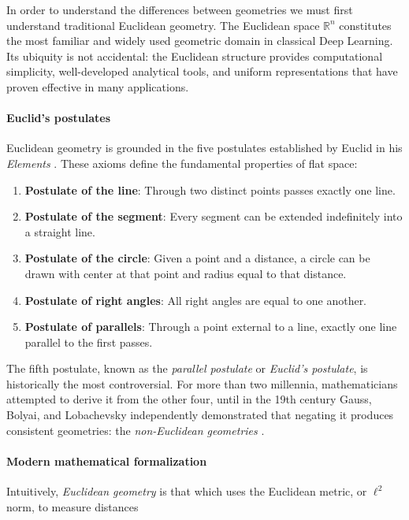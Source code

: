 In order to understand the differences between geometries we must first understand traditional Euclidean geometry. The Euclidean space $\mathbb{R}^n$ constitutes the most familiar and widely used geometric domain in classical Deep Learning. Its ubiquity is not accidental: the Euclidean structure provides computational simplicity, well-developed analytical tools, and uniform representations that have proven effective in many applications.

\paragraph{Euclid's postulates}

Euclidean geometry is grounded in the five postulates established by Euclid in his \textit{Elements} \citep{euclid1956elements}. These axioms define the fundamental properties of flat space:

\begin{enumerate}
    \item \textbf{Postulate of the line}: Through two distinct points passes exactly one line.
    \item \textbf{Postulate of the segment}: Every segment can be extended indefinitely into a straight line.
    \item \textbf{Postulate of the circle}: Given a point and a distance, a circle can be drawn with center at that point and radius equal to that distance.
    \item \textbf{Postulate of right angles}: All right angles are equal to one another.
    \item \textbf{Postulate of parallels}: Through a point external to a line, exactly one line parallel to the first passes.
\end{enumerate}

The fifth postulate, known as the \textit{parallel postulate} or \textit{Euclid's postulate}, is historically the most controversial. For more than two millennia, mathematicians attempted to derive it from the other four, until in the 19th century Gauss, Bolyai, and Lobachevsky independently demonstrated that negating it produces consistent geometries: the \textit{non-Euclidean geometries} \citep{gray2007worlds}.

\paragraph{Modern mathematical formalization}

Intuitively, \textit{Euclidean geometry} is that which uses the Euclidean metric, or $\ell^2$ norm, to measure distances


